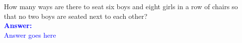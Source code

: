 \item{}
How many ways are there to seat six boys and eight girls in a row of chairs so
that no two boys are seated next to each other?\\[12pt]
\ifanswers
\textcolor{blue}{
\textbf{Answer:}\\[6pt]
Answer goes here
}
\newpage
\fi
